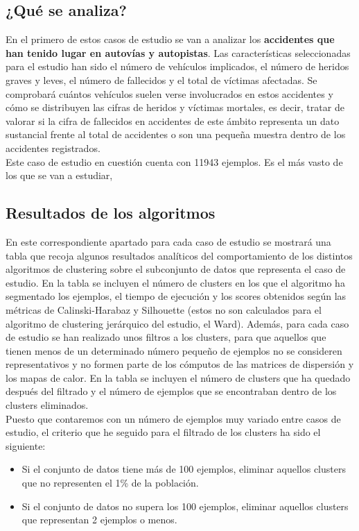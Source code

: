 	\subsection{¿Qué se analiza?}
	En el primero de estos casos de estudio se van a analizar los \textbf{accidentes que han tenido lugar en autovías y autopistas}. Las características seleccionadas para el estudio han sido el número de vehículos implicados, el número de heridos graves y leves, el número de fallecidos y el total de víctimas afectadas. Se comprobará cuántos vehículos suelen verse involucrados en estos accidentes y cómo se distribuyen las cifras de heridos y víctimas mortales, es decir, tratar de valorar si la cifra de fallecidos en accidentes de este ámbito representa un dato sustancial frente al total de accidentes o son una pequeña muestra dentro de los accidentes registrados.\\
	
	Este caso de estudio en cuestión cuenta con 11943 ejemplos. Es el más vasto de los que se van a estudiar,
	
	\subsection{Resultados de los algoritmos}
	En este correspondiente apartado para cada caso de estudio se mostrará una tabla que recoja algunos resultados analíticos del comportamiento de los distintos algoritmos de clustering sobre el subconjunto de datos que representa el caso de estudio. En la tabla se incluyen el número de clusters en los que el algoritmo ha segmentado los ejemplos, el tiempo de ejecución y los scores obtenidos según las métricas de Calinski-Harabaz y Silhouette (estos no son calculados para el algoritmo de clustering jerárquico del estudio, el Ward). Además, para cada caso de estudio se han realizado unos filtros a los clusters, para que aquellos que tienen menos de un determinado número pequeño de ejemplos no se consideren representativos y no formen parte de los cómputos de las matrices de dispersión y los mapas de calor. En la tabla se incluyen el número de clusters que ha quedado después del filtrado y el número de ejemplos que se encontraban dentro de los clusters eliminados.\\
	
	Puesto que contaremos con un número de ejemplos muy variado entre casos de estudio, el criterio que he seguido para el filtrado de los clusters ha sido el siguiente:
	\begin{itemize}
		\item Si el conjunto de datos tiene más de 100 ejemplos, eliminar aquellos clusters que no representen el 1\% de la población.
		\item Si el conjunto de datos no supera los 100 ejemplos, eliminar aquellos clusters que representan 2 ejemplos o menos.
	\end{itemize}

